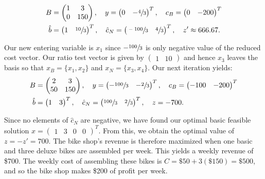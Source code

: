 \begin{solution}
  \begin{align*}
    B &= \begin{pmatrix}
      1 & 3 \\
      0 & 150
    \end{pmatrix}, \quad y = \begin{pmatrix}
      0 & -\sfrac{4}{3}
    \end{pmatrix}^T, \quad c_B = \begin{pmatrix}
      0 & -200
    \end{pmatrix}^T \\
    \hat{b} &= \begin{pmatrix}
      1 & \sfrac{10}{3}
    \end{pmatrix}^T, \quad \hat{c}_N = \begin{pmatrix}
      \sfrac{-100}{3} & \sfrac{4}{3}
    \end{pmatrix}^T, \quad z' \approx 666.67.
  \end{align*}

  Our new entering variable is $x_1$ since $-\sfrac{100}{3}$ is only negative value of the reduced cost vector. Our 
  ratio test vector is given by $\begin{pmatrix} 1 & 10 \end{pmatrix}$ and hence $x_3$ leaves the basis so that 
  $x_B = \{ x_1, x_2 \}$ and $x_N = \{ x_3, x_4 \}$. Our next iteration yields:
  \begin{align*}
    B &= \begin{pmatrix}
      2  & 3 \\
      50 & 150
    \end{pmatrix}, \quad y = \begin{pmatrix}
      -\sfrac{100}{3} & -\sfrac{2}{3}
    \end{pmatrix}^T, \quad c_B = \begin{pmatrix}
      -100 & -200
    \end{pmatrix}^T \\
    \hat{b} &= \begin{pmatrix}
      1 & 3
    \end{pmatrix}^T, \quad \hat{c}_N = \begin{pmatrix}
      \sfrac{100}{3} & \sfrac{2}{3}
    \end{pmatrix}^T, \quad z = -700.
  \end{align*}

  Since no elements of $\hat{c}_N$ are negative, we have found our optimal basic feasible solution
  $x = \begin{pmatrix} 1 & 3 & 0 & 0 \end{pmatrix}^T$. From this, we obtain the optimal value of $z = -z' = 700$.
  The bike shop's revenue is therefore maximized when one basic and three deluxe bikes are assembled per week. This
  yields a weekly revenue of \$700. The weekly cost of assembling these bikes is $C = \$50 + 3(\$150) = \$500$, and so
  the bike shop makes \$200 of profit per week.
\end{solution}